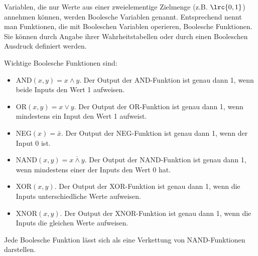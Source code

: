 \begin{mysummary}
    Variablen, die nur Werte aus einer zweielementige Zielmenge (z.B. $\lrc{0, 1}$) annehmen können, werden Boolesche Variablen genannt. Entsprechend nennt man Funktionen, die mit Booleschen Variablen operieren, Boolesche Funktionen. Sie können durch Angabe ihrer Wahrheitstabellen oder durch einen Booleschen Ausdruck definiert werden.

    Wichtige Boolesche Funktionen sind:
    \begin{itemize}
        \item AND$(x,y) = x\wedge y$. Der Output der AND-Funktion ist genau dann 1, wenn beide Inputs den Wert 1 aufweisen.
        \item OR$(x,y) = x\vee y$. Der Output der OR-Funktion ist genau dann 1, wenn mindestens ein Input den Wert 1 aufweist.
        \item NEG$(x) = \bar x$. Der Output der NEG-Funktion ist genau dann 1, wenn der Input 0 ist.
        \item NAND$(x,y)= \overline{x\wedge y}$. Der Output der NAND-Funktion ist genau dann 1, wenn mindestens einer der Inputs den Wert 0 hat.
        \item XOR$(x,y)$. Der Output der XOR-Funktion ist genau dann 1, wenn die Inputs unterschiedliche Werte aufweisen.
        \item XNOR$(x,y)$. Der Output der XNOR-Funktion ist genau dann 1, wenn die Inputs die gleichen Werte aufweisen.
    \end{itemize}

    Jede Boolesche Funktion lässt sich als eine Verkettung von NAND-Funktionen darstellen.
\end{mysummary}


